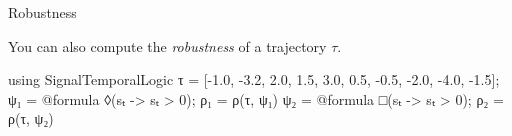\begin{frame}[fragile,t]{Robustness}

\phantom{}

You can also compute the \textit{robustness} of a trajectory $\tau$.

\phantom{}

\begin{footnotesize}
\begin{juliaconsole}
using SignalTemporalLogic
τ = [-1.0, -3.2, 2.0, 1.5, 3.0, 0.5, -0.5, -2.0, -4.0, -1.5];
ψ₁ = @formula ◊(sₜ -> sₜ > 0);
ρ₁ = ρ(τ, ψ₁)
ψ₂ = @formula □(sₜ -> sₜ > 0);
ρ₂ = ρ(τ, ψ₂)
\end{juliaconsole}
\end{footnotesize}


\end{frame}
